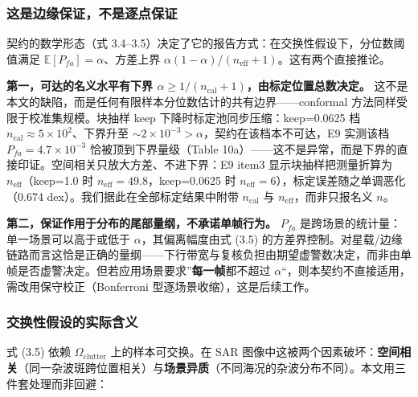 \subsubsection{这是边缘保证，不是逐点保证}\label{ux8fd9ux662fux8fb9ux7f18ux4fddux8bc1ux4e0dux662fux9010ux70b9ux4fddux8bc1}

契约的数学形态（式
3.4--3.5）决定了它的报告方式：在交换性假设下，分位数阈值满足
\(\mathbb{E}[P_{fa}]=\alpha\)、方差上界
\(\alpha(1-\alpha)/(n_{\mathrm{eff}}+1)\)。这有两个直接推论。

\textbf{第一，可达的名义水平有下界
\(\alpha\ge 1/(n_{\mathrm{cal}}+1)\)，由标定位置总数决定。}
这不是本文的缺陷，而是任何有限样本分位数估计的共有边界------conformal
方法同样受限于校准集规模。块抽样 keep 下降时标定池同步压缩：keep=0.0625
档 \(n_{\mathrm{cal}}\approx5\times10^{2}\)、下界升至
\(\sim2\times10^{-3}>\alpha\)，契约在该档本不可达，E9 实测该档
\(P_{fa}=4.7\times10^{-3}\) 恰被顶到下界量级（Table
10a）------这不是异常，而是下界的直接印证。空间相关只放大方差、不进下界：E9
item3 显示块抽样把测量折算为 \(n_{\mathrm{eff}}\)（keep=1.0 时
\(n_{\mathrm{eff}}=49.8\)，keep=0.0625 时
\(n_{\mathrm{eff}}=6\)），标定误差随之单调恶化（0.674
dex）。我们据此在全部标定结果中附带 \(n_{\mathrm{cal}}\) 与
\(n_{\mathrm{eff}}\)，而非只报名义 \(n\)。

\textbf{第二，保证作用于分布的尾部量纲，不承诺单帧行为。} \(P_{fa}\)
是跨场景的统计量：单一场景可以高于或低于 \(\alpha\)，其偏离幅度由式
(3.5)
的方差界控制。对星载/边缘链路而言这恰是正确的量纲------下行带宽与复核负担由期望虚警数决定，而非由单帧是否虚警决定。但若应用场景要求''\textbf{每一帧}都不超过
\(\alpha\)``，则本契约不直接适用，需改用保守校正（Bonferroni
型逐场景收缩），这是后续工作。

\subsubsection{交换性假设的实际含义}\label{ux4ea4ux6362ux6027ux5047ux8bbeux7684ux5b9eux9645ux542bux4e49}

式 (3.5) 依赖 \(\Omega_{\mathrm{clutter}}\) 上的样本可交换。在 SAR
图像中这被两个因素破坏：\textbf{空间相关}（同一杂波斑跨位置相关）与\textbf{场景异质}（不同海况的杂波分布不同）。本文用三件套处理而非回避：

